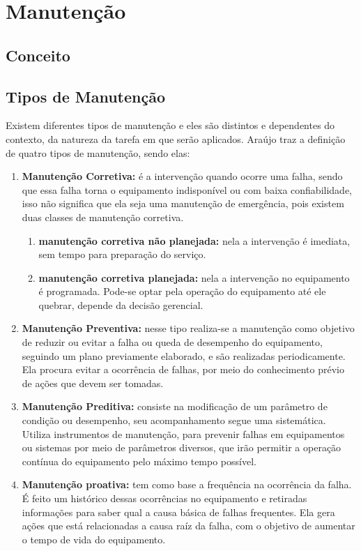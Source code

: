 \chapter{Manutenção}
\label{cap-manutencao}

\section{Conceito}

\section{Tipos de Manutenção}

Existem diferentes tipos de manutenção e eles são distintos e dependentes do contexto, da natureza da tarefa em que serão aplicados. Araújo \cite{araujo2015} traz a definição de quatro tipos de manutenção, sendo elas:

\begin{enumerate}
	\item \textbf{Manutenção Corretiva:} é a intervenção quando ocorre uma falha, sendo que essa falha torna o equipamento indisponível ou com baixa confiabilidade, isso não significa que ela seja uma manutenção de emergência, pois existem duas classes de manutenção corretiva.
		\begin{enumerate}
			\item \textbf{manutenção corretiva não planejada:} nela a intervenção é imediata, sem tempo para preparação do serviço.
			\item \textbf{manutenção corretiva planejada:} nela a intervenção no equipamento é programada. Pode-se optar pela operação do equipamento até ele quebrar, depende da decisão gerencial.
		\end{enumerate}
	\item \textbf{Manutenção Preventiva:} nesse tipo realiza-se a manutenção como objetivo de reduzir ou evitar a falha ou queda de desempenho do equipamento, seguindo um plano previamente elaborado, e são realizadas periodicamente. Ela procura evitar a ocorrência de falhas, por meio do conhecimento prévio de ações que devem ser tomadas.
	\item \textbf{Manutenção Preditiva:} consiste na modificação de um parâmetro de condição ou desempenho, seu acompanhamento segue uma sistemática. Utiliza instrumentos de manutenção, para prevenir falhas em equipamentos ou sistemas por meio de parâmetros diversos, que irão permitir a operação contínua do equipamento pelo máximo tempo possível.
	\item \textbf{Manutenção proativa:} tem como base a frequência na ocorrência da falha. É feito um histórico dessas ocorrências no equipamento e retiradas informações para saber qual a causa básica de falhas frequentes. Ela gera ações que está relacionadas a causa raíz da falha, com o objetivo de aumentar o tempo de vida do equipamento.
\end{enumerate}

